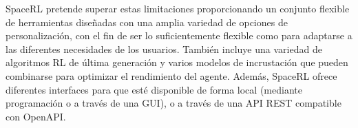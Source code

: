 {SpaceRL pretende superar estas limitaciones proporcionando un conjunto flexible de herramientas diseñadas con una amplia variedad de opciones de personalización, con el fin de ser lo suficientemente flexible como para adaptarse a las diferentes necesidades de los usuarios. También incluye una variedad de algoritmos RL de última generación y varios modelos de incrustación que pueden combinarse para optimizar el rendimiento del agente. Además, SpaceRL ofrece diferentes interfaces para que esté disponible de forma local (mediante programación o a través de una GUI), o a través de una API REST compatible con OpenAPI.}